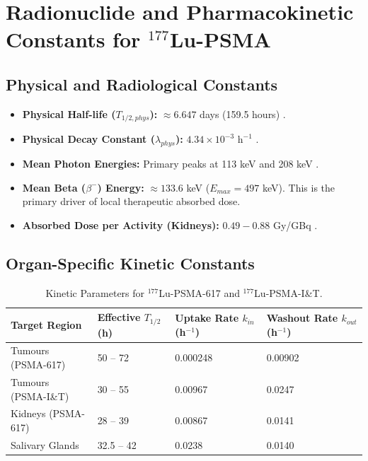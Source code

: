 \documentclass[11pt,a4paper]{article}
\begin{document}
\section{Radionuclide and Pharmacokinetic Constants for $^{177}$Lu-PSMA}

\subsection{Physical and Radiological Constants}
\begin{itemize}
    \item \textbf{Physical Half-life ($T_{1/2,phys}$):} $\approx 6.647$ days (159.5 hours) \cite{HardiansyahYousefzadehNowshahr2024}.
    \item \textbf{Physical Decay Constant ($\lambda_{phys}$):} $4.34 \times 10^{-3} \text{ h}^{-1}$ \cite{ReschFouladgar2023}.
    \item \textbf{Mean Photon Energies:} Primary peaks at 113 keV and 208 keV \cite{StabinMadsen2019}.
    \item \textbf{Mean Beta ($\beta^-$) Energy:} $\approx 133.6$ keV ($E_{max} = 497$ keV). This is the primary driver of local therapeutic absorbed dose.
    \item \textbf{Absorbed Dose per Activity (Kidneys):} $0.49 - 0.88$ Gy/GBq \cite{ChuamsaamarkkeeCharoenphun2025, OkamotoThieme2016}.
\end{itemize}

\subsection{Organ-Specific Kinetic Constants}
\begin{table}[h!]
\centering
\caption{Kinetic Parameters for $^{177}$Lu-PSMA-617 and $^{177}$Lu-PSMA-I\&T.}
\begin{tabular}{@{}llll@{}}
\toprule
\textbf{Target Region} & \textbf{Effective $T_{1/2}$ (h)} & \textbf{Uptake Rate $k_{in}$ (h$^{-1}$)} & \textbf{Washout Rate $k_{out}$ (h$^{-1}$)} \\ \midrule
Tumours (PSMA-617) & 50 -- 72 \cite{PetersHofferber2021} & 0.000248 \cite{SiebingaPriv2023} & 0.00902 \cite{SiebingaPriv2023} \\
Tumours (PSMA-I\&T) & 30 -- 55 \cite{SiebingaVeen2024} & 0.00967 \cite{SiebingaVeen2024} & 0.0247 \cite{SiebingaVeen2024} \\
Kidneys (PSMA-617) & 28 -- 39 \cite{PetersHofferber2021} & 0.00867 \cite{SiebingaPriv2023} & 0.0141 \cite{SiebingaPriv2023} \\
Salivary Glands & 32.5 -- 42 \cite{PetersPriv2021} & 0.0238 \cite{SiebingaPriv2023} & 0.0140 \cite{SiebingaPriv2023} \\
\bottomrule
\end{tabular}
\end{table}
\end{document}
